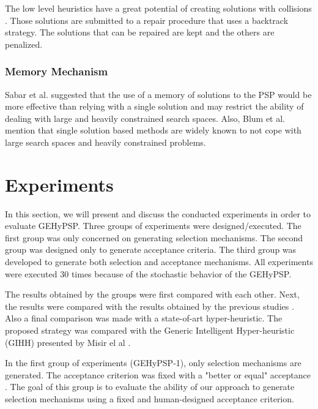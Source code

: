 \documentclass[conference]{IEEEtran}
\begin{document}
The low level heuristics have a great potential of creating solutions with collisions \cite{benitez2015algoritmo}. Those solutions are submitted to a repair procedure that uses a backtrack strategy. The solutions that can be repaired are kept and the others are penalized. 
 


\subsubsection{Memory Mechanism}
Sabar et al. \cite{sabar2015automatic} suggested that the use of a memory of solutions to the PSP would be more effective than relying with a single solution and may restrict the ability of dealing with large and heavily constrained search spaces. Also, Blum et al. \cite{blum2011hybrid} mention that single solution based methods are widely known to not cope with large search spaces and heavily constrained problems.



\section{Experiments}
\label{sec:experiments}


In this section, we will present and discuss the conducted experiments in order to evaluate GEHyPSP. Three groups of experiments were designed/executed. The first group was only concerned on generating selection mechanisms. The second group was designed only to generate acceptance criteria. The third group was developed to generate both selection and acceptance mechanisms. All experiments were executed 30 times because of the stochastic behavior of the GEHyPSP. 


The results obtained by the groups were first compared with each other. Next, the results were compared with the results obtained by the previous studies \cite{custodio2004investigation,lin2011protein,santana2008component,custodio2014multiple}. Also a final comparison was made with a state-of-art hyper-heuristic. The proposed strategy was compared with the Generic Intelligent Hyper-heuristic (GIHH) presented by Misir el al \cite{misir2012intelligent}.



In the first group of  experiments (GEHyPSP-1), only selection mechanisms are generated. The acceptance criterion was fixed with a "better or equal" acceptance \cite{burke2009exploring}. The goal of this group is to evaluate the ability of our approach to generate selection mechanisms using a fixed and human-designed acceptance criterion.   
\end{document}
